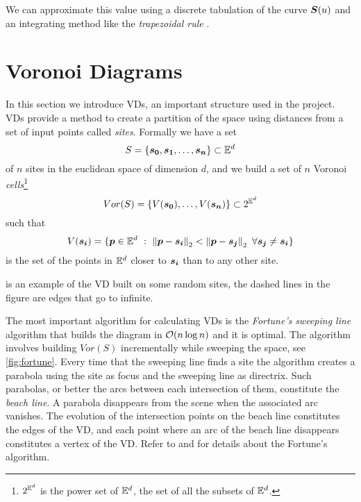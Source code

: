 \documentclass[dissertation.tex]{subfiles}
\begin{document}
We can approximate this value using a discrete tabulation of the curve
$\boldsymbol{S}(u)$ and an integrating method like the \emph{trapezoidal
  rule} \cite{press}\cite{stoer}.

\section{Voronoi Diagrams}\label{sec:voronoi}
In this section we introduce \acfp{VD}, an important structure used in
the project. \acp{VD} \cite{deberg} provide a method to create a
partition of the
space using distances from a set of input points called
\emph{sites}. Formally we have a set
\begin{equation*}
  S=\{\boldsymbol{s_0},\boldsymbol{s_1},\dots,\boldsymbol{s_n}\} \subset \mathbb{E}^d
\end{equation*}
of $n$ sites in the euclidean space of dimension $d$, and we build a
set of $n$ Voronoi \emph{cells}\footnote{$2^{\mathbb{E}^d}$ is the power set of
  $\mathbb{E}^d$, the set of all the subsets of $\mathbb{E}^d$.}
\begin{equation*}
  Vor(S)=\{V(\boldsymbol{s_0}),\dots,V(\boldsymbol{s_n})\}\subset 2^{\mathbb{E}^d}
\end{equation*}
such that
\begin{equation*}
  V(\boldsymbol{\boldsymbol{s_i}})=\{\boldsymbol{p}\in\mathbb{E}^d\ :\
  \left\lVert\boldsymbol{p}-\boldsymbol{s_i}\right\rVert_2<\left\lVert\boldsymbol{p}-\boldsymbol{s_j}\right\rVert_2\ \forall \boldsymbol{s_j}\neq\boldsymbol{s_i}\}
\end{equation*}
is the set of the points in $\mathbb{E}^d$ closer to $\boldsymbol{s_i}$ than to any
other site.

\Cref{fig:voronoi} is an example of the \ac{VD} built on some random
sites, the dashed lines in the figure are edges that go to infinite.

The most important algorithm for
calculating \acp{VD} is the \emph{Fortune's}
\emph{sweeping line} algorithm that builds the diagram in $\mathcal{O}(n\log
n)$ and it is optimal. The algorithm involves building $Vor(S)$
incrementally while sweeping the space, see \cref{fig:fortune}. Every
time that the sweeping
line finds a site the algorithm creates a parabola using the site as
focus and the sweeping line as directrix. Such parabolas, or better
the arcs between each intersection of them, constitute
the \emph{beach line}. A parabola disappears from the scene when the
associated
arc vanishes. The evolution of the intersection points on the beach line
constitutes the edges of the \ac{VD}, and each point where an arc of
the beach line disappears constitutes a vertex of the \ac{VD}.
Refer to \cite{deberg} and
\cite{fortune} for details about the Fortune's algorithm.
\end{document}
